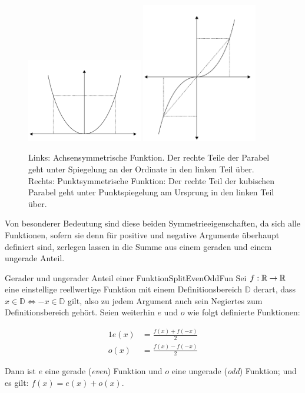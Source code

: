 \begin{figure}
    \centering
    \includegraphics[width=0.45\textwidth]{./svg/axis-symmetric-fun}
    \includegraphics[width=0.45\textwidth]{./svg/point-symmetric-fun}
    \caption{Links: Achsensymmetrische Funktion. Der rechte Teile der Parabel geht unter Spiegelung an der Ordinate in den linken Teil über. Rechts: Punktsymmetrische Funktion: Der rechte Teil der kubischen Parabel geht unter Punktspiegelung am Ursprung in den linken Teil über.}
    \label{fig:ExAxisSymFun}
\end{figure}

Von besonderer Bedeutung sind diese beiden Symmetrieeigenschaften, da sich alle Funktionen, sofern sie denn für positive und negative Argumente überhaupt definiert sind, zerlegen lassen in die Summe aus einem geraden und einem ungerade Anteil.

\begin{statement}{Gerader und ungerader Anteil einer Funktion}{SplitEvenOddFun}
    Sei $f: \mathbb{R} \to \mathbb{R}$ eine einstellige reellwertige Funktion mit einem Definitionsbereich $\mathbb{D}$ derart, dass $x\in\mathbb{D} \iff -x\in\mathbb{D}$ gilt, also zu jedem Argument auch sein Negiertes zum Definitionsbereich gehört. Seien weiterhin $e$ und $o$ wie folgt definierte Funktionen:

    \begin{alignat*}{1}
        e(x) &= \frac{f(x) + f(-x)}{2} \\
        o(x) &= \frac{f(x) - f(-x)}{2}
    \end{alignat*}

    Dann ist $e$ eine gerade (\emph{even}) Funktion und $o$ eine ungerade (\emph{odd}) Funktion; und es gilt: $f(x) = e(x) + o(x)$.
\end{statement}

